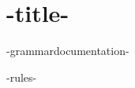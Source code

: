\documentclass{article}
\begin{document}
\section*{-title-}
-grammardocumentation-

-rules-
\end{document}
